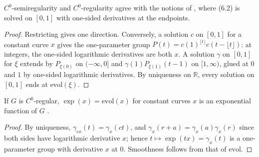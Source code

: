 \begin{proposition}[Solutions on {$[0, 1]$}]
  \label{prop:regular-interval}
  \leanok
  $C^0$-semiregularity and $C^0$-regularity agree with the notions of
  \cite[Definition 6.1.1]{GN26}, where (6.2) is solved on $[0, 1]$ with one-sided derivatives at
  the endpoints.
\end{proposition}

\begin{proof}
  \leanok
  Restricting gives one direction. Conversely, a solution $c$ on $[0, 1]$ for a constant curve
  $x$ gives the one-parameter group $P(t) = c(1)^{\lfloor t\rfloor} c(t - \lfloor t\rfloor)$: at
  integers, the one-sided logarithmic derivatives are both $x$. A solution $\gamma$ on $[0, 1]$
  for $\xi$ extends by $P_{\xi(0)}$ on $(-\infty, 0]$ and $\gamma(1)P_{\xi(1)}(t - 1)$ on
  $[1, \infty)$, glued at $0$ and $1$ by one-sided logarithmic derivatives. By uniqueness on
  $\mathbb{R}$, every solution on $[0, 1]$ ends at $\mathrm{evol}(\xi)$.
\end{proof}

\begin{theorem}
  \label{thm:regular-exp}
  \leanok
  If $G$ is $C^0$-regular, $\exp(x) = \mathrm{evol}(x)$ for constant curves $x$ is an exponential
  function of $G$ \cite[Remark 6.1.2(a)]{GN26}.
\end{theorem}

\begin{proof}
  \leanok
  By uniqueness, $\gamma_{cx}(t) = \gamma_x(ct)$, and $\gamma_x(r + a) = \gamma_x(a)\gamma_x(r)$
  since both sides have logarithmic derivative $x$; hence $t \mapsto \exp(tx) = \gamma_x(t)$ is a
  one-parameter group with derivative $x$ at $0$. Smoothness follows from that of $\mathrm{evol}$.
\end{proof}

